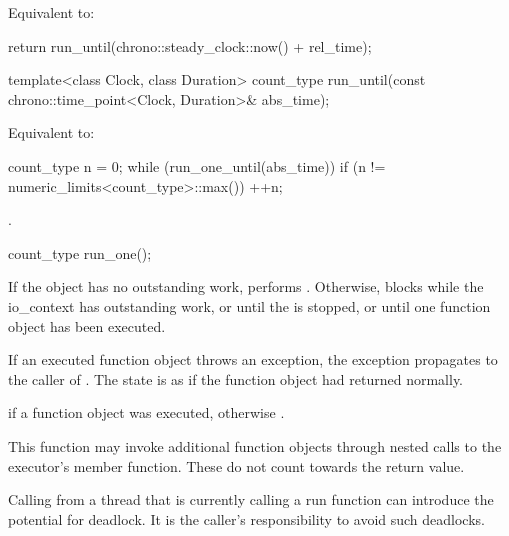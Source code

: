 \begin{itemdescr}
\pnum
\effects Equivalent to:
\begin{codeblock}
return run_until(chrono::steady_clock::now() + rel_time);
\end{codeblock}

\end{itemdescr}

%
\begin{itemdecl}
template<class Clock, class Duration>
  count_type run_until(const chrono::time_point<Clock, Duration>& abs_time);
\end{itemdecl}

\begin{itemdescr}
\pnum
\effects Equivalent to:
\begin{codeblock}
count_type n = 0;
while (run_one_until(abs_time))
  if (n != numeric_limits<count_type>::max())
    ++n;
\end{codeblock}


\pnum
\returns {}.
\end{itemdescr}

%
\begin{itemdecl}
count_type run_one();
\end{itemdecl}

\begin{itemdescr}
\pnum
\effects If the  object has no outstanding work, performs . Otherwise, blocks while the io_context has outstanding work, or until the  is stopped, or until one function object has been executed.

\pnum
If an executed function object throws an exception, the exception propagates to the caller of . The  state is as if the function object had returned normally.

\pnum
\returns {} if a function object was executed, otherwise .

\pnum
\remarks This function may invoke additional function objects through nested calls to the  executor's  member function. These do not count towards the return value.

\pnum
\begin{note}
Calling  from a thread that is currently calling a run function
can introduce the potential for deadlock.
It is the caller's responsibility to avoid such deadlocks.
\end{note}
\end{itemdescr}

